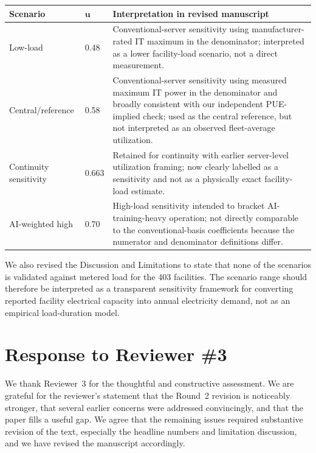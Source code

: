 \documentclass[11pt]{article}
\begin{document}
\begin{center}
\small
\begin{tabular}{p{}p{}p{}}
\toprule
\textbf{Scenario} & $\boldsymbol{u}$ & \textbf{Interpretation in revised manuscript} \\
\midrule
Low-load & 0.48 & Conventional-server sensitivity using manufacturer-rated IT maximum in the denominator; interpreted as a lower facility-load scenario, not a direct measurement. \\
Central/reference & 0.58 & Conventional-server sensitivity using measured maximum IT power in the denominator and broadly consistent with our independent PUE-implied check; used as the central reference, but not interpreted as an observed fleet-average utilization. \\
Continuity sensitivity & 0.663 & Retained for continuity with earlier server-level utilization framing; now clearly labelled as a sensitivity and not as a physically exact facility-load estimate. \\
AI-weighted high & 0.70 & High-load sensitivity intended to bracket AI-training-heavy operation; not directly comparable to the conventional-basis coefficients because the numerator and denominator definitions differ. \\
\bottomrule
\end{tabular}
\end{center}

We also revised the Discussion and Limitations to state that none of the scenarios is validated against metered load for the 403 facilities. The scenario range should therefore be interpreted as a transparent sensitivity framework for converting reported facility electrical capacity into annual electricity demand, not as an empirical load-duration model.

\bigskip

\section*{Response to Reviewer \#3}

We thank Reviewer~3 for the thoughtful and constructive assessment. We are grateful for the reviewer's statement that the Round~2 revision is noticeably stronger, that several earlier concerns were addressed convincingly, and that the paper fills a useful gap. We agree that the remaining issues required substantive revision of the text, especially the headline numbers and limitation discussion, and we have revised the manuscript accordingly.
\end{document}
